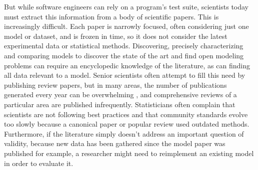 \documentclass[9pt]{sig-alternate}
\begin{document}
But while software engineers can rely on a program's test suite, scientists today must extract this information from a body of scientific papers. This is increasingly difficult. Each paper is narrowly focused, often considering just one model or dataset, and is frozen in time, so it does not consider the latest experimental data or statistical methods. Discovering, precisely characterizing and comparing models to discover the state of the art and find open modeling problems can require an encyclopedic knowledge of the literature, as can finding all data relevant to a model. Senior scientists often attempt to fill this need by publishing review papers, but in many areas, the number of publications generated every year can be overwhelming \cite{jinha_article_2010}, and comprehensive reviews of a particular area are published infrequently. Statisticians often complain that scientists are not following best practices and that community standards evolve too slowly because a canonical paper or popular review used outdated methods. Furthermore, if the literature simply doesn't address an important question of validity, because  new data has been gathered since the model paper was published for example, a researcher might need to reimplement an existing model in order to evaluate it. 
\end{document}
